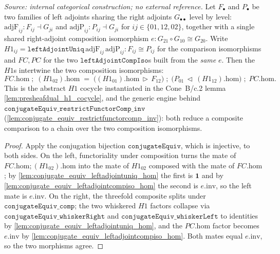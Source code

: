 \begin{lemma}
  \label{lem:leftadjointuniq_leftadjointcompiso_comm}
  \textit{Source: internal categorical construction; no external reference.}
  Let \(F_\bullet\) and \(P_\bullet\) be two families of left adjoints sharing the right adjoints
  \(G_{\bullet\bullet}\) level by level: \(\mathrm{adjF}_{ij} : F_{ij} \dashv G_{ji}\) and
  \(\mathrm{adjP}_{ij} : P_{ij} \dashv G_{ji}\) for \(ij \in \{01, 12, 02\}\), together with a single
  shared right-adjoint composition isomorphism \(e : G_{21} \circ G_{10} \cong G_{20}\). Write
  \(H1_{ij} = \mathtt{leftAdjointUniq}\,\mathrm{adjF}_{ij}\,\mathrm{adjP}_{ij} : F_{ij} \cong P_{ij}\)
  for the comparison isomorphisms and \(FC, PC\) for the two
  \(\mathtt{leftAdjointCompIso}\)s built from the \emph{same} \(e\). Then the \(H1\)s intertwine the two
  composition isomorphisms:
  \[
    FC.\mathrm{hom} \;\mathbin{;}\; (H1_{02}).\mathrm{hom}
      \;=\; \bigl((H1_{01}).\mathrm{hom} \,\triangleright\, F_{12}\bigr)
        \;\mathbin{;}\; \bigl(P_{01} \,\triangleleft\, (H1_{12}).\mathrm{hom}\bigr)
        \;\mathbin{;}\; PC.\mathrm{hom} .
  \]
  This is the abstract \(H1\) cocycle instantiated in the Cone~B/c.2 lemma
  \cref{lem:presheafdual_h1_cocycle}, and the generic engine behind
  \(\mathtt{conjugateEquiv\_restrictFunctorComp\_inv}\)
  (\cref{lem:conjugate_equiv_restrictfunctorcomp_inv}): both reduce a composite comparison to a chain
  over the two composition isomorphisms.
\end{lemma}
\begin{proof}
  \leanok
  Apply the conjugation bijection \(\mathtt{conjugateEquiv}\), which is injective, to both sides. On the
  left, functoriality under composition turns the mate of \(FC.\mathrm{hom} \mathbin{;} (H1_{02}).\mathrm{hom}\)
  into the mate of \(H1_{02}\) composed with the mate of \(FC.\mathrm{hom}\); by
  \cref{lem:conjugate_equiv_leftadjointuniq_hom} the first is \(\mathbf{1}\) and by
  \cref{lem:conjugate_equiv_leftadjointcompiso_hom} the second is \(e.\mathrm{inv}\), so the left mate is
  \(e.\mathrm{inv}\). On the right, the threefold composite splits under
  \(\mathtt{conjugateEquiv\_comp}\); the two whiskered \(H1\) factors collapse via
  \(\mathtt{conjugateEquiv\_whiskerRight}\) and \(\mathtt{conjugateEquiv\_whiskerLeft}\) to identities by
  \cref{lem:conjugate_equiv_leftadjointuniq_hom}, and the \(PC.\mathrm{hom}\) factor becomes
  \(e.\mathrm{inv}\) by \cref{lem:conjugate_equiv_leftadjointcompiso_hom}. Both mates equal \(e.\mathrm{inv}\),
  so the two morphisms agree.
\end{proof}

